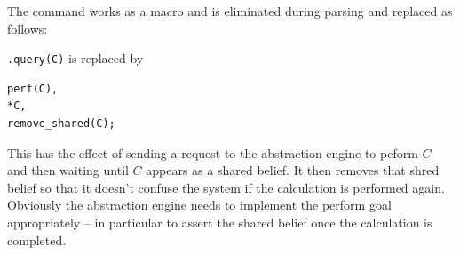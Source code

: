 \documentclass[a4]{article}
\begin{document}
The command works as a macro and is eliminated during parsing and replaced as follows:

\texttt{.query(C)} is replaced by
\begin{verbatim}
perf(C),
*C,
remove_shared(C);
\end{verbatim}
This has the effect of sending a request to the abstraction engine to peform $C$ and then waiting until $C$ appears as a shared belief.  It then removes that shred belief so that it doesn't confuse the system if the calculation is performed again.  Obviously the abstraction engine needs to implement the perform goal appropriately -- in particular to assert the shared belief once the calculation is completed.



\end{document}

